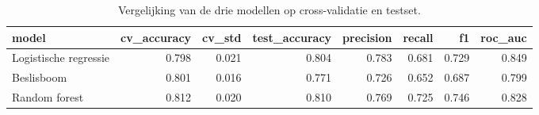 \begin{table}[htbp]
\caption{Vergelijking van de drie modellen op cross-validatie en testset.}
\label{tab:modelvergelijking}
\begin{tabular}{lrrrrrrr}
\toprule
model & cv\_accuracy & cv\_std & test\_accuracy & precision & recall & f1 & roc\_auc \\
\midrule
Logistische regressie & 0.798 & 0.021 & 0.804 & 0.783 & 0.681 & 0.729 & 0.849 \\
Beslisboom & 0.801 & 0.016 & 0.771 & 0.726 & 0.652 & 0.687 & 0.799 \\
Random forest & 0.812 & 0.020 & 0.810 & 0.769 & 0.725 & 0.746 & 0.828 \\
\bottomrule
\end{tabular}
\end{table}
